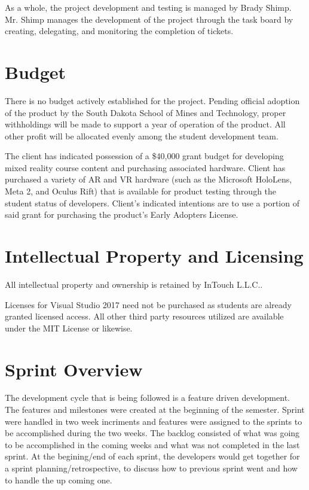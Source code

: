 As a whole, the project development and testing is managed by Brady Shimp. Mr. Shimp manages the development of the project through the task board by creating, delegating, and monitoring the completion of tickets. 

\section{Budget}

There is no budget actively established for the project. Pending official adoption of the product by the South Dakota School of Mines and Technology, proper withholdings will be made to support a year of operation of the product. All other profit will be allocated evenly among the student development team. 

The client has indicated possession of a \$40,000 grant budget for developing mixed reality course content and purchasing associated hardware. Client has purchased a variety of AR and VR hardware (such as the Microsoft HoloLens, Meta 2, and Oculus Rift) that is available for product testing through the student status of developers. Client's indicated intentions are to use a portion of said grant for purchasing the product's Early Adopters License. 

\section{Intellectual Property and Licensing}

All intellectual property and ownership is retained by InTouch L.L.C.. 

Licenses for Visual Studio 2017 need not be purchased as students are already granted licensed access. All other third party resources utilized are available under the MIT License or likewise. 


\section{Sprint  Overview}
The development cycle that is being followed is a feature driven development.
The features and milestones were created at the beginning of the semester.
Sprint were handled in two week incriments and features were assigned to 
the sprints to be accomplished during the two weeks. The backlog consisted
of what was going to be accomplished in the coming weeks and what was not
completed in the last sprint. At the begining/end of each sprint, the 
developers would get together for a sprint planning/retrospective, to discuss
how to previous sprint went and how to handle the up coming one.


